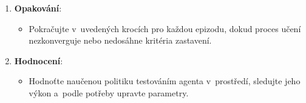 \begin{enumerate}
\begin{itemize}
\begin{itemize}
\begin{itemize}
\begin{itemize}
\[                    y = r + \gamma \cdot \max_{a'} Q_{\text{target}}(s', a')
                    \]
                    kde $\gamma$ je diskontní faktor a $\max_{a'} Q_{\text{target}}(s', a')$ je maximální Q-hodnota pro následující stav $s'$ podle cílové sítě.
                    \item Aktualizujte Q-síť minimalizováním \textbf{průměrné kvadratické chyby} mezi předpovězenou Q-hodnotou a~cílovou Q-hodnotou:
                    \[
                    \text{Loss} = \left( Q(s, a) - y \right)^2~\]
                \end{itemize}
                \item \textbf{Periodická aktualizace}: Periodicky aktualizujte váhy cílové sítě zkopírováním vah z~Q-sítě.
            \end{itemize}
        \end{itemize}
    \end{itemize}
    
    \item \textbf{Opakování}:
    \begin{itemize}
        \item Pokračujte v~uvedených krocích pro každou epizodu, dokud proces učení nezkonverguje nebo nedosáhne kritéria zastavení.
    \end{itemize}
    
    \item \textbf{Hodnocení}:
    \begin{itemize}
        \item Hodnoťte naučenou politiku testováním agenta v~prostředí, sledujte jeho výkon a~podle potřeby upravte parametry.
    \end{itemize}
\end{enumerate}

\newpage

